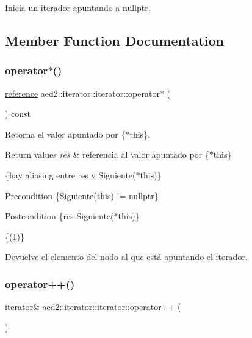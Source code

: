 Inicia un iterador apuntando a nullptr. 

\subsection{Member Function Documentation}
\mbox{\label{classaed2_1_1iterator_1_1iterator_a5d87de9e96d5efd0456e8f7aec240b8d}} 
\subsubsection{\texorpdfstring{operator$\ast$()}{operator*()}}
{\footnotesize\ttfamily \hyperlink{classaed2_1_1iterator_1_1iterator_a91be74b60dfc3eabfa5a69d9aa068959}{reference} aed2\+::iterator\+::iterator\+::operator$\ast$ (\begin{DoxyParamCaption}{ }\end{DoxyParamCaption}) const\hspace{0.3cm}{\ttfamily [inline]}}



Retorna el valor apuntado por \{$\ast$this\}. 


\begin{DoxyRetVals}{Return values}
{\em res} & referencia al valor apuntado por \{$\ast$this\}\\
\hline
\end{DoxyRetVals}
\{hay aliasing entre res y Siguiente($\ast$this)\}

\begin{DoxyPrecond}{Precondition}
\{Siguiente(this) != nullptr\} 
\end{DoxyPrecond}
\begin{DoxyPostcond}{Postcondition}
\{res  Siguiente($\ast$this)\}
\end{DoxyPostcond}
\{(1)\}

Devuelve el elemento del nodo al que está apuntando el iterador. \mbox{\label{classaed2_1_1iterator_1_1iterator_a457fdf0ed06c88121b441424f1c99f4f}} 
\subsubsection{\texorpdfstring{operator++()}{operator++()}\hspace{0.1cm}{\footnotesize\ttfamily [1/2]}}
{\footnotesize\ttfamily \hyperlink{classaed2_1_1iterator_1_1iterator}{iterator}\& aed2\+::iterator\+::iterator\+::operator++ (\begin{DoxyParamCaption}{ }\end{DoxyParamCaption})\hspace{0.3cm}{\ttfamily [inline]}}



